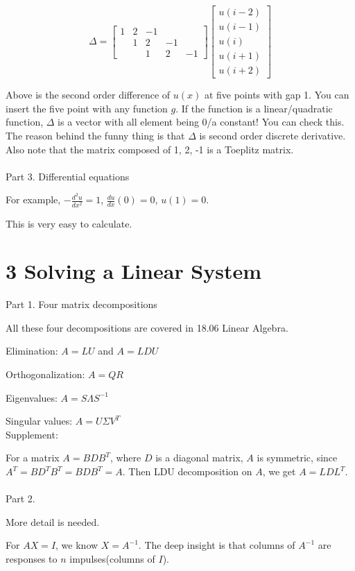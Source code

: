 \documentclass{article}
\begin{document}
\begin{spacing}{1.5}
$$
\Delta = 
\begin{bmatrix}
1 & 2 & -1 \\
  & 1 & 2 & -1 \\
  &   & 1 & 2 & -1
\end{bmatrix}
\begin{bmatrix}
u(i-2) \\
u(i-1) \\
u(i) \\
u(i+1) \\
u(i+2)
\end{bmatrix}
$$

Above is the second order difference of $u(x)$ at five points with gap 1. You can insert the five point with any function $g$. If the function is a linear/quadratic function, $\Delta$ is a vector with all element being 0/a constant! You can check this. The reason behind the funny thing is that $\Delta$ is second order discrete derivative. Also note that the matrix composed of 1, 2, -1 is a Toeplitz matrix.
\\\\ Part 3. Differential equations

For example, $-\frac{d^2u}{dx^2}=1$, $\frac{du}{dx}(0)=0$, $u(1)=0$. 

This is very easy to calculate.


\section*{3 Solving a Linear System}
Part 1. Four matrix decompositions

All these four decompositions are covered in 18.06 Linear Algebra.

Elimination: $A=LU$ and $A=LDU$

Orthogonalization: $A=QR$

Eigenvalues: $A=S\Lambda S^{-1}$

Singular values: $A=U\Sigma V^T$
\\Supplement:

For a matrix $A=BDB^T$, where $D$ is a diagonal matrix, $A$ is symmetric, since $A^T=BD^TB^T=BDB^T=A$. Then LDU decomposition on $A$, we get $A=LDL^T$.
\\\\Part 2.

More detail is needed.

For $AX=I$, we know $X=A^{-1}$. The deep insight is that columns of $A^{-1}$ are responses to $n$ impulses(columns of $I$).



\end{spacing}
\end{document}
